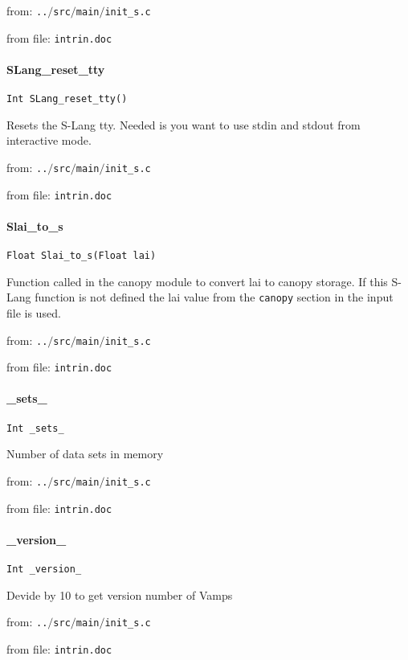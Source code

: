 from: {\tt ..$/$src$/$main$/$init\_s.c}

from file: {\tt intrin.doc}


\paragraph{SLang\_reset\_tty}
\begin{verbatim}
Int SLang_reset_tty()
\end{verbatim}
Resets the S-Lang tty. Needed is you want to use stdin and
stdout from interactive mode.  


from: {\tt ..$/$src$/$main$/$init\_s.c}

from file: {\tt intrin.doc}


\paragraph{Slai\_to\_s}
\begin{verbatim}
Float Slai_to_s(Float lai)
\end{verbatim}
Function called in the canopy module to convert lai to
canopy storage. If this S-Lang function is not defined the
lai value from the {\tt canopy} section in the input file is used.


from: {\tt ..$/$src$/$main$/$init\_s.c}

from file: {\tt intrin.doc}


\paragraph{\_sets\_}
\begin{verbatim}
Int _sets_
\end{verbatim}
Number of data sets in memory 


from: {\tt ..$/$src$/$main$/$init\_s.c}

from file: {\tt intrin.doc}


\paragraph{\_version\_}
\begin{verbatim}
Int _version_
\end{verbatim}
Devide by 10 to get version number of Vamps 


from: {\tt ..$/$src$/$main$/$init\_s.c}

from file: {\tt intrin.doc}


